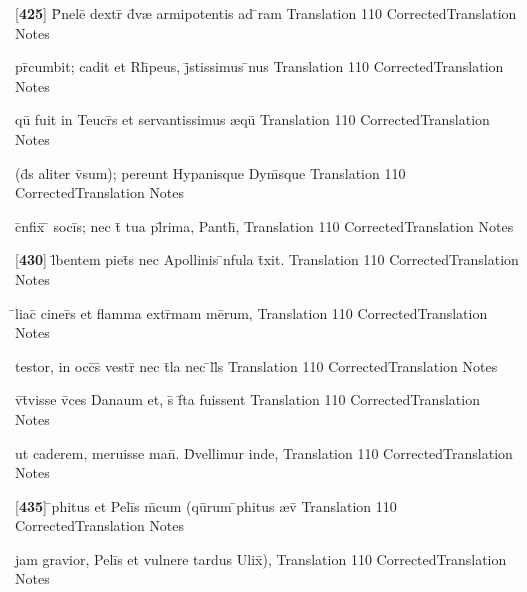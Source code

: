 \latline
  {[\textbf{425}] P\={}nele\={\macron {\i}} dextr\={} d\={\macron {\i}}v{\ae} armipotentis ad \={}ram}
  { Translation }
  {110}
  { CorrectedTranslation }
  { Notes }


\latline
  {pr\={}cumbit; cadit et Rh\={\macron {\i}}peus, j\={}stissimus \={}nus}
  { Translation }
  {110}
  { CorrectedTranslation }
  { Notes }


\latline
  {qu\={\macron {\i}} fuit in Teucr\={\macron {\i}}s et servantissimus {\ae}qu\={\macron {\i}}}
  { Translation }
  {110}
  { CorrectedTranslation }
  { Notes }


\latline
  {(d\={\macron {\i}}s aliter v\={\macron {\i}}sum); pereunt Hypanisque Dym\={}sque}
  { Translation }
  {110}
  { CorrectedTranslation }
  { Notes }


\latline
  {c\={}nfix\={\macron {\i}} \={} soci\={\macron {\i}}s; nec t\={} tua pl\={}rima, Panth\={},}
  { Translation }
  {110}
  { CorrectedTranslation }
  { Notes }


\latline
  {[\textbf{430}] l\={}bentem piet\={}s nec Apollinis \={\macron {\i}}nfula t\={}xit.}
  { Translation }
  {110}
  { CorrectedTranslation }
  { Notes }


\latline
  {\={}liac\={\macron {\i}} ciner\={}s et flamma extr\={}mam me\={}rum,}
  { Translation }
  {110}
  { CorrectedTranslation }
  { Notes }


\latline
  {testor, in occ\={}s\={} vestr\={} nec t\={}la nec \={}ll\={}s}
  { Translation }
  {110}
  { CorrectedTranslation }
  { Notes }


\latline
  {v\={\macron {\i}}t\={}visse v\={\macron {\i}}ces Danaum et, s\={\macron {\i}} f\={}ta fuissent}
  { Translation }
  {110}
  { CorrectedTranslation }
  { Notes }


\latline
  {ut caderem, meruisse man\={}.  D\={\macron {\i}}vellimur inde,}
  { Translation }
  {110}
  { CorrectedTranslation }
  { Notes }


\latline
  {[\textbf{435}] \={}phitus et Peli\={}s m\={}cum (qu\={}rum \={}phitus {\ae}v\={}}
  { Translation }
  {110}
  { CorrectedTranslation }
  { Notes }


\latline
  {jam gravior, Peli\={}s et vulnere tardus Ulix\={\macron {\i}}),}
  { Translation }
  {110}
  { CorrectedTranslation }
  { Notes }


